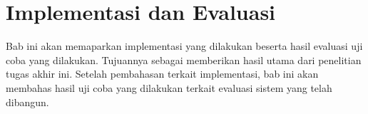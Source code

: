 \chapter{Implementasi dan Evaluasi}
\label{chapter:implementasi-dan-evaluasi}
Bab ini akan memaparkan implementasi yang dilakukan beserta hasil evaluasi uji coba yang dilakukan. Tujuannya sebagai memberikan hasil utama dari penelitian tugas akhir ini. Setelah pembahasan terkait implementasi, bab ini akan membahas hasil uji coba yang dilakukan terkait evaluasi sistem yang telah dibangun.





